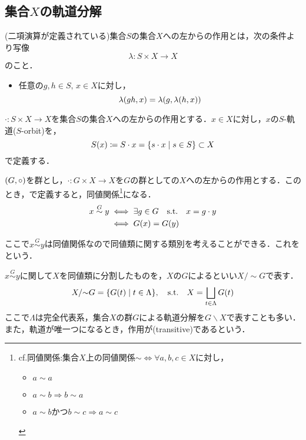 \documentclass[main]{subfiles}
\begin{document}
	\subsection{集合$X$の軌道分解}
		\begin{dfn}
			(二項演算が定義されている)集合$S$の集合$X$への左からの作用とは，次の条件より写像
			\[\lambda:S\times X\to X\]
			のこと．
			\begin{itemize}
				\item 任意の$g,h\in S,\,x\in X$に対し，
					\[\lambda\qty(gh,x)=\lambda\qty(g,\lambda\qty(h,x))\]
			\end{itemize}
		\end{dfn}
		\begin{dfn}
			$\cdot:S\times X\to X$を集合$S$の集合$X$への左からの作用とする．$x\in X$に対し，$x$の$S$-軌道($S$-orbit)を，
			\[S\qty(x)\coloneqq S\cdot x=\qty{s\cdot x\mid s\in S}\subset X\]
			で定義する．
		\end{dfn}
		\begin{prop}
			$\qty(G,\circ)$を群とし，$\cdot :G\times X\to X$を$G$の群としての$X$への左からの作用とする．このとき，で定義すると，同値関係\footnote{cf.同値関係:集合$X$上の同値関係$\sim\iff\forall a,b,c\in X$に対し，\begin{itemize}
					\item $a\sim a$
					\item $a\sim b\Rightarrow b\sim a$
					\item $a\sim b$かつ$b\sim c\Rightarrow a\sim c$
				\end{itemize}}になる．
			\begin{align*}
				x\stackrel{G}{\sim}y & \iff\exists g\in G\text{\quad s.t.\quad} x=g\cdot y \\
				                     & \iff G\qty(x)=G\qty(y)
			\end{align*}
		\end{prop}
		ここで$x\stackrel{G}{\sim}y$は同値関係なので同値類に関する類別を考えることができる．これをという．
		\begin{dfn}
			$x\stackrel{G}{\sim}y$に関して$X$を同値類に分割したものを，$X$の$G$によるといい$X/{\sim} G$で表す．
			\[X/{\sim} G=\qty{G\qty(t)\mid t\in\Lambda},\text{\quad s.t.\quad} X=\bigsqcup_{t\in\Lambda}G\qty(t)\]
			ここで$\Lambda$は完全代表系，集合$X$の群$G$による軌道分解を$G\backslash X$で表すことも多い．また，軌道が唯一つになるとき，作用が(transitive)であるという．
		\end{dfn}
\end{document}
